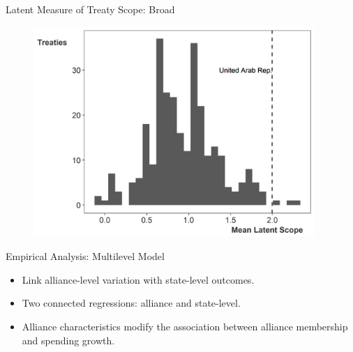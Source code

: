 \documentclass{beamer}
\begin{document}

\begin{frame}{Latent Measure of Treaty Scope: Broad}

\begin{figure}[htbp]
	\centering
		\includegraphics[width=0.95\textwidth]{ls-hist-broad.png}
\end{figure}


\end{frame} 



\begin{frame}{Empirical Analysis: Multilevel Model}

\begin{itemize} 
\item Link alliance-level variation with state-level outcomes. 
\pause
\item Two connected regressions: alliance and state-level. 
\pause 
\item Alliance characteristics modify the association between alliance membership and spending growth.  
\end{itemize} 

\end{frame} 


\end{document}
